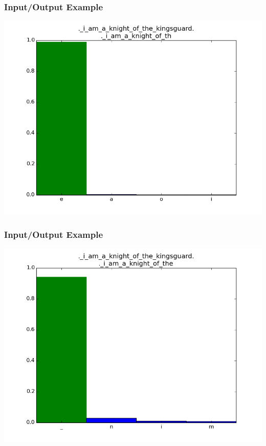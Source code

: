 \documentclass[12]{beamer}
\begin{document}
\begin{frame}
\frametitle{Input/Output Example}
\begin{center}
\includegraphics[scale=0.4]{../distplot/20.png}
\end{center}
\end{frame}

\begin{frame}
\frametitle{Input/Output Example}
\begin{center}
\includegraphics[scale=0.4]{../distplot/21.png}
\end{center}
\end{frame}
\end{document}
